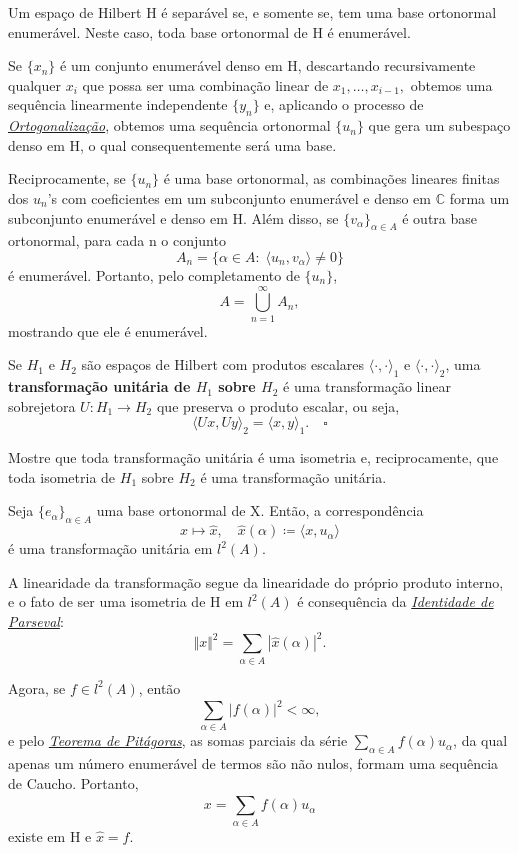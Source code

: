 \documentclass[../functional_analysis.tex]{subfiles}
\begin{document}
\begin{theorem*}
	Um espaço de Hilbert H é separável se, e somente se, tem uma base ortonormal enumerável. Neste caso, toda base ortonormal de H é enumerável.
\end{theorem*}
\begin{proof*}
	Se \(\{x_{n}\}\) é um conjunto enumerável denso em H, descartando recursivamente qualquer \(x_{i}\) que possa ser uma combinação linear de \(x_1,\dotsc ,x_{i-1},\) obtemos uma sequência linearmente independente \(\{y_{n}\}\) e, aplicando o processo de \hyperlink{gram_schmidt}{\textit{Ortogonalização}}, obtemos uma sequência ortonormal \(\{u_{n}\}\) que gera um subespaço denso em H, o qual consequentemente será uma base.

	Reciprocamente, se \(\{u_{n}\}\) é uma base ortonormal, as combinações lineares finitas dos \(u_{n}\)'s com coeficientes em um subconjunto enumerável e denso em \(\mathbb{C}\) forma um subconjunto enumerável e denso em H. Além disso, se \(\{v_{\alpha }\}_{\alpha \in A}\) é outra base ortonormal, para cada n o conjunto
	\[
		A_{n}=\{\alpha \in A:\; \langle u_{n}, v_{\alpha } \rangle\neq 0\}
	\]
	é enumerável. Portanto, pelo completamento de \(\{u_{n}\}\),
	\[
		A = \bigcup_{n=1}^{\infty}A_{n},
	\]
	mostrando que ele é enumerável. \qedsymbol
\end{proof*}
\begin{def*}
	Se \(H_1\) e \(H_2\) são espaços de Hilbert com produtos escalares \(\langle \cdot , \cdot  \rangle_1\) e \(\langle \cdot , \cdot  \rangle_2\), uma \textbf{transformação unitária de \(H_1\) sobre \(H_2\)} é uma transformação linear sobrejetora \(U:H_1\rightarrow H_2\) que preserva o produto escalar, ou seja,
	\[
		\langle Ux, Uy \rangle_2 = \langle x, y \rangle_1. \quad \square
	\]
\end{def*}
\begin{exr}
	Mostre que toda transformação unitária é uma isometria e, reciprocamente, que toda isometria de \(H_1\) sobre \(H_2\) é uma transformação unitária.
\end{exr}
\begin{prop*}
	Seja \(\{e_{\alpha }\}_{\alpha \in A}\) uma base ortonormal de X. Então, a correspondência
	\[
		x\mapsto \hat{x},\quad \hat{x}(\alpha )\coloneqq \langle x, u_{\alpha } \rangle
	\]
	é uma transformação unitária em \(l^{2}(A).\)
\end{prop*}
\begin{proof*}
	A linearidade da transformação segue da linearidade do próprio produto interno, e o fato de ser uma isometria de H em \(l^{2}(A)\) é consequência da \hyperlink{parseval_identity}{\textit{Identidade de Parseval}}:
	\[
		\Vert x \Vert^{2} = \sum\limits_{\alpha \in A}^{}| \hat{x}(\alpha ) |^{2}.
	\]

	Agora, se \(f\in l^{2}(A)\), então
	\[
		\sum\limits_{\alpha \in A}^{} | f(\alpha ) |^{2}<\infty,
	\]
	e pelo \hyperlink{pythagorean_theorem}{\textit{Teorema de Pitágoras}}, as somas parciais da série \(\sum\limits_{\alpha \in A}^{}f(\alpha )u_{\alpha }\), da qual apenas um número enumerável de termos são não nulos, formam uma sequência de Caucho. Portanto,
	\[
		x = \sum\limits_{\alpha \in A}^{}f(\alpha )u_{\alpha }
	\]
	existe em H e \(\hat{x}=f.\) \qedsymbol
\end{proof*}
\end{document}

